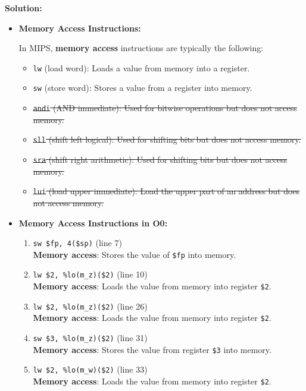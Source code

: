 \textbf{Solution:}

\begin{itemize}

\item \textbf{Memory Access Instructions:} 

In MIPS, \textbf{memory access} instructions are typically the following:
\begin{itemize}
    \item \texttt{lw} (load word): Loads a value from memory into a register.
    \item \texttt{sw} (store word): Stores a value from a register into memory.
    \item \sout{\texttt{andi} (AND immediate): Used for bitwise operations but does not access memory.}
    \item \sout{\texttt{sll} (shift left logical): Used for shifting bits but does not access memory.}
    \item \sout{\texttt{sra} (shift right arithmetic): Used for shifting bits but does not access memory.}
    \item \sout{\texttt{lui} (load upper immediate): Load the upper part of an address but does not access memory.}
\end{itemize}

\item \textbf{Memory Access Instructions in O0:}

\begin{enumerate}
    \tiny
    \item \texttt{sw \$fp, 4(\$sp)} (line 7) \\
    \textbf{Memory access}: Stores the value of \texttt{\$fp} into memory.

    \item \texttt{lw \$2, \%lo(m\_z)(\$2)} (line 10) \\
    \textbf{Memory access}: Loads the value from memory into register \texttt{\$2}.

    \item \texttt{lw \$2, \%lo(m\_z)(\$2)} (line 26) \\
    \textbf{Memory access}: Loads the value from memory into register \texttt{\$2}.

    \item \texttt{sw \$3, \%lo(m\_z)(\$2)} (line 31) \\
    \textbf{Memory access}: Stores the value from register \texttt{\$3} into memory.

    \item \texttt{lw \$2, \%lo(m\_w)(\$2)} (line 33) \\
    \textbf{Memory access}: Loads the value from memory into register \texttt{\$2}.


\end{enumerate}
\end{itemize}
